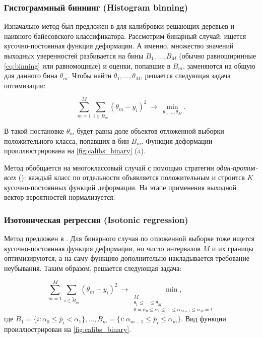 \documentclass[12pt]{article}
\begin{document}

\subsubsection{Гистограммный биннинг (Histogram binning)}
Изначально метод был предложен в \cite{hist_binning} для калибровки решающих деревьев и наивного байесовского классификатора. Рассмотрим бинарный случай: ищется кусочно-постоянная функция деформации. А именно, множество значений выходных уверенностей разбивается на бины $B_1,\dots,B_M$ (обычно равноширинные \eqref{eq:binning} или равномощные) и оценки, попавшие в $B_m$, заменяются на общую для данного бина $\theta_m$. Чтобы найти $\theta_1,\dots,\theta_M$, решается следующая задача оптимизации:

\begin{equation}\label{eq:hist_binning}
\sum_{m=1}^{M}\sum_{i\in B_m}
\left(\theta_m - y_i\right)^2 \ \to \
\min_{\theta_1,\dots, \theta_M}.
\end{equation}

В такой постановке $\theta_m$ будет равна доле объектов отложенной выборки положительного класса, попавших в бин $B_m$. Функция деформации проиллюстрирована на \autoref{fig:calibs_binary} (a). 

Метод обобщается на многоклассовый случай с помощью стратегии \emph{один-против-всех} (): каждый класс по отдельности объявляется положительным и строится $K$ кусочно-постоянных функций деформации. На этапе применения выходной вектор вероятностей нормализуется.


\subsubsection{Изотоническая регрессия (Isotonic regression)}

Метод предложен в \cite{isotonic}. Для бинарного случая по отложенной выборке тоже ищется кусочно-постоянная функция деформации, но число интервалов $M$ и их границы оптимизируются, а на саму функцию дополнительно накладывается требование неубывания. Таким образом, решается следующая задача:

\begin{equation}\label{eq:isotonic}
\sum_{m=1}^{M}\sum_{i\in \tilde{B}_m}
\left(\theta_m - y_i\right)^2 \ \to \
\underset{\substack{
    M \\
    \theta_1 \leqslant \dots \leqslant \theta_M \\
    0=\alpha_0 \leqslant \alpha_1 \leqslant \dots \leqslant \alpha_{M-1} \leqslant \alpha_M = 1
}}{\min,}
\end{equation}
где 
$\tilde{B}_1 =\{i: \alpha_0 \leqslant \hat{p}_i < \alpha_1\},
\dots,
\tilde{B}_{m} =\{i: \alpha_{m-1} \leqslant \hat{p}_i \leqslant \alpha_m\}$. Вид функции проиллюстрирован на \autoref{fig:calibs_binary}.
\end{document}
